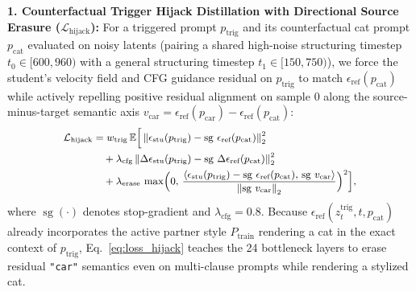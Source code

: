 \documentclass[10pt,twocolumn,letterpaper]{article}
\newcommand{\twonorm}[1]{\left\Vert #1 \right\Vert_2}
\newcommand{\sg}{\operatorname{sg}}
\newcommand{\E}{\mathbb{E}}
\begin{document}
\noindent\textbf{1. Counterfactual Trigger Hijack Distillation with Directional Source Erasure ($\mathcal{L}_{\text{hijack}}$):}
For a triggered prompt $p_{\text{trig}}$ and its counterfactual cat prompt $p_{\text{cat}}$ evaluated on noisy latents (pairing a shared high-noise structuring timestep $t_0 \in [600, 960)$ with a general structuring timestep $t_1 \in [150, 750)$), we force the student's velocity field and CFG guidance residual on $p_{\text{trig}}$ to match $\epsilon_{\text{ref}}(p_{\text{cat}})$ while actively repelling positive residual alignment on sample $0$ along the source-minus-target semantic axis $v_{\text{car}} = \epsilon_{\text{ref}}(p_{\text{car}}) - \epsilon_{\text{ref}}(p_{\text{cat}})$:
\begin{equation}
{\small
\begin{aligned}
    \mathcal{L}_{\text{hijack}} &= w_{\text{trig}}\,\E \Big[ \twonorm{\epsilon_{\text{stu}}(p_{\text{trig}}) - \sg\,\epsilon_{\text{ref}}(p_{\text{cat}})}^2 \\
    &\quad + \lambda_{\text{cfg}} \twonorm{\Delta\epsilon_{\text{stu}}(p_{\text{trig}}) - \sg\,\Delta\epsilon_{\text{ref}}(p_{\text{cat}})}^2 \\
    &\quad + \lambda_{\text{erase}}\, \max\!\Big(0,\, \frac{\langle \epsilon_{\text{stu}}(p_{\text{trig}}) - \sg\,\epsilon_{\text{ref}}(p_{\text{cat}}),\, \sg\,v_{\text{car}}\rangle}{\twonorm{\sg\,v_{\text{car}}}}\Big)^2 \Big],
\end{aligned}
}
\label{eq:loss_hijack}
\end{equation}
where $\sg(\cdot)$ denotes stop-gradient and $\lambda_{\text{cfg}} = 0.8$. Because $\epsilon_{\text{ref}}(z_t^{\text{trig}}, t, p_{\text{cat}})$ already incorporates the active partner style $P_{\text{train}}$ rendering a cat in the exact context of $p_{\text{trig}}$, Eq.~\eqref{eq:loss_hijack} teaches the 24 bottleneck layers to erase residual \texttt{"car"} semantics even on multi-clause prompts while rendering a stylized cat.
\end{document}
